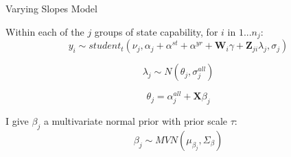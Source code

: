 \documentclass[12pt]{beamer}
\begin{document}
%
%
%
%
%
%
%
%
%
%
%
%
%
%
%
%
%
%
%





\begin{frame}{Varying Slopes Model}

Within each of the $j$ groups of state capability, for $i$ in $1 ... n_j$: 
\begin{equation*}
y_i \sim student_t(\nu_j, \alpha_j + \alpha^{st} + \alpha^{yr} +\textbf{W}_{i} \gamma  + \textbf{Z}_{ji} \lambda_{j}, \sigma_j) 
\end{equation*} 

\begin{equation*}
\lambda_{j} \sim N(\theta_{j}, \sigma^{all}_{j})
\end{equation*} 

\begin{equation*}
\theta_{j} = \alpha^{all}_{j} + \textbf{X} \beta_j
\end{equation*}

I give $\beta_j$ a multivariate normal prior with prior scale $\tau$:
\begin{equation*}
\beta_j \sim MVN(\mu_{\beta_j}, \Sigma_{\beta}) 
\end{equation*}

\end{frame}


\end{document}

